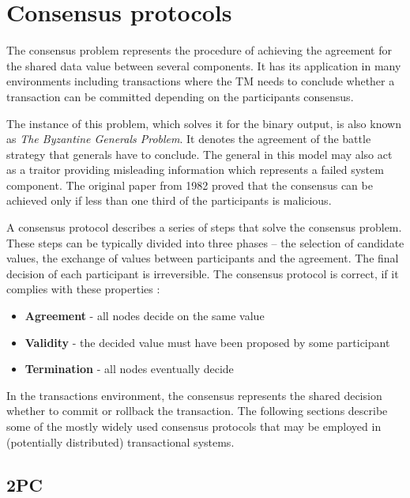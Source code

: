 \documentclass[oneside,
  digital, %
  table,   %
  nolof,     %
  nolot,     %
]{fithesis3}
\begin{document}
\section{Consensus protocols}
\label{sec:consensus-protocols}

The consensus problem represents the procedure of achieving the  agreement for the shared data value between several components. It has its application in many environments including transactions where the TM needs to conclude whether a transaction can be committed depending on the participants consensus.

The instance of this problem, which solves it for the binary output, is also known as \textit{The Byzantine Generals Problem}. It denotes the agreement of the battle strategy that generals have to conclude. The general in this model may also act as a traitor providing misleading information which represents a failed system component. The original paper from 1982 \cite{byzantine-generals-problem} proved that the consensus can be achieved only if less than one third of the participants is malicious. 

A consensus protocol describes a series of steps that solve the consensus problem. These steps can be typically divided into three phases -- the selection of candidate values, the exchange of values between participants and the agreement. The final decision of each participant is irreversible. The consensus protocol is correct, if it complies with these properties \cite{2PC}:

\begin{itemize}
    \item \textbf{Agreement} - all nodes decide on the same value
    \item \textbf{Validity} - the decided value must have been proposed by some participant
    \item \textbf{Termination} - all nodes eventually decide
\end{itemize}


In the transactions environment, the consensus represents the shared decision whether to commit or rollback the transaction. The following sections describe some of the mostly widely used consensus protocols that may be employed in (potentially distributed) transactional systems.

\subsection{2PC}
\end{document}
